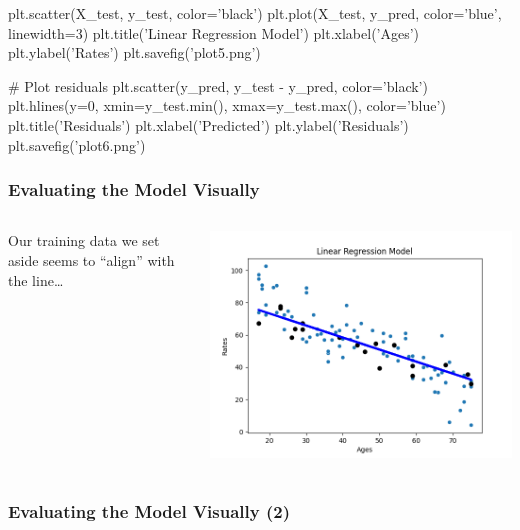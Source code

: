\documentclass{beamer}
\newcounter{slidenum}
\begin{document}
\begin{pycode}
plt.scatter(X_test, y_test, color='black')
plt.plot(X_test, y_pred, color='blue', linewidth=3)
plt.title('Linear Regression Model')
plt.xlabel('Ages')
plt.ylabel('Rates')
plt.savefig('plot5.png')

# Plot residuals
plt.scatter(y_pred, y_test - y_pred, color='black')
plt.hlines(y=0, xmin=y_test.min(), xmax=y_test.max(), color='blue')
plt.title('Residuals')
plt.xlabel('Predicted')
plt.ylabel('Residuals')
plt.savefig('plot6.png')
\end{pycode}
\begin{frame}
	\frametitle{Evaluating the Model Visually}
	\begin{columns}
Our training data we set aside seems to ``align'' with the line\ldots

\includegraphics[width=\textwidth]{plot5.png}
\end{columns}
\end{frame}

\begin{frame}
	\frametitle{Evaluating the Model Visually (2)}

\end{frame}
\end{document}
